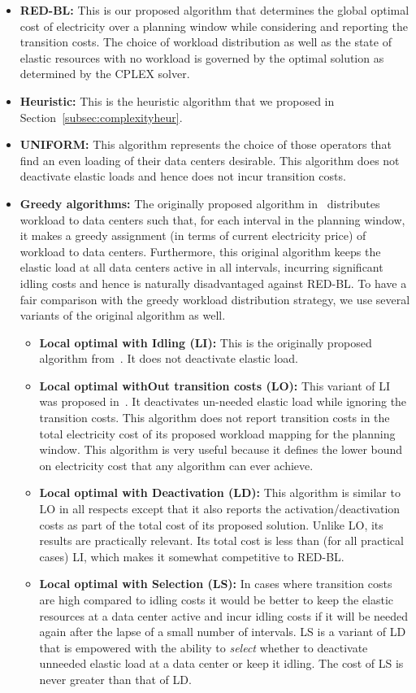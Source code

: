 \begin{itemize}
\item \textbf{RED-BL:} This is our proposed algorithm that determines the global optimal cost of electricity over a planning window while considering and reporting the transition costs. The choice of workload distribution as well as the state of elastic resources with no workload is governed by the optimal solution as determined by the CPLEX solver.
\item \textbf{Heuristic:} This is the heuristic algorithm that we proposed in Section~\ref{subsec:complexityheur}.
\item \textbf{UNIFORM:} This algorithm represents the choice of those operators that find an even loading of their data centers desirable. This algorithm does not deactivate elastic loads and hence does not incur transition costs.
\item \textbf{Greedy algorithms:} The originally proposed algorithm in~\cite{qureshi2009cutting} distributes workload to data centers such that, for each interval in the planning window, it makes a greedy assignment (in terms of current electricity price) of workload to data centers. Furthermore, this original algorithm keeps the elastic load at all data centers active in all intervals, incurring significant idling costs and hence is naturally disadvantaged against RED-BL. To have a fair comparison with the greedy workload distribution strategy, we use several variants of the original algorithm as well.
\begin{itemize}
\item \textbf{Local optimal with Idling (LI):} This is the originally proposed algorithm from~\cite{qureshi2009cutting}. It does not deactivate elastic load.
\item \textbf{Local optimal withOut transition costs (LO):} This variant of LI was proposed in~\cite{qureshi2009cutting}. It deactivates un-needed elastic load while ignoring the transition costs. This algorithm does not report transition costs in the total electricity cost of its proposed workload mapping for the planning window. This algorithm is very useful because it defines the lower bound on electricity cost that any algorithm can ever achieve.
\item \textbf{Local optimal with Deactivation (LD):} This algorithm is similar to LO in all respects except that it also reports the activation/deactivation costs as part of the total cost of its proposed solution. Unlike LO, its results are practically relevant. Its total cost is less than (for all practical cases) LI, which makes it somewhat competitive to RED-BL.
\item \textbf{Local optimal with Selection (LS):} In cases where transition costs are high compared to idling costs it would be better to keep the elastic resources at a data center active and incur idling costs if it will be needed again after the lapse of a small number of intervals. LS is a variant of LD that is empowered with the ability to \textit{select} whether to deactivate unneeded elastic load at a data center or keep it idling. The cost of LS is never greater than that of LD.
\end{itemize}
\end{itemize}

